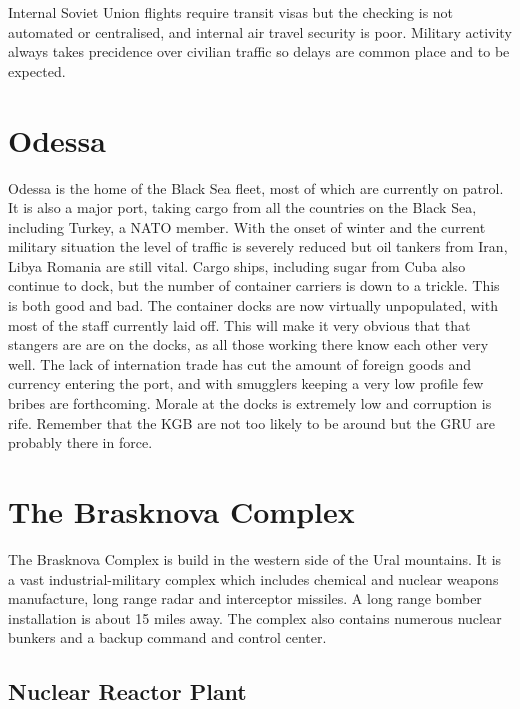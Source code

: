 \documentclass{amsart}
\begin{document}
\begin{multicols}{3}
Internal Soviet Union flights require transit visas but the checking
is not automated or centralised, and internal air travel security is
poor.  Military activity always takes precidence over civilian traffic
so delays are common place and to be expected.

\section{Odessa}

Odessa is the home of the Black Sea fleet, most of which are currently
on patrol.  It is also a major port, taking cargo from all the
countries on the Black Sea, including Turkey, a NATO member.  With the
onset of winter and the current military situation the level of
traffic is severely reduced but oil tankers from Iran, Libya Romania
are still vital.  Cargo ships, including sugar from Cuba also continue
to dock, but the number of container carriers is down to a trickle.
This is both good and bad.  The container docks are now virtually
unpopulated, with most of the staff currently laid off.  This will
make it very obvious that that stangers are are on the docks, as
all those working there know each other very well.  The lack of
internation trade has cut the amount of foreign goods and currency
entering the port, and with smugglers keeping a very low profile
few bribes are forthcoming.  Morale at the docks is extremely low
and corruption is rife.  Remember that the KGB are not too
likely to be around but the GRU are probably there in force.

\section{The Brasknova Complex}

The Brasknova Complex is build in the western side of the Ural
mountains.  It is a vast industrial-military complex which includes
chemical and nuclear weapons manufacture, long range radar and
interceptor missiles.  A long range bomber installation is about 15
miles away.  The complex also contains numerous nuclear bunkers and a
backup command and control center.

\subsection{Nuclear Reactor Plant}


\end{multicols}
\end{document}
